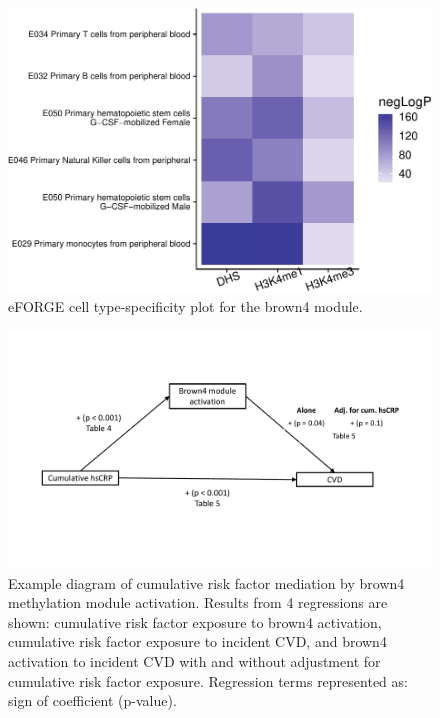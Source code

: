 \documentclass[]{article}
\begin{document}
\begin{figure}[htbp]
\centering
\includegraphics{../doc/module_ewas/figures/print-eforge-plots-1.pdf}
\caption{\label{fig:print-eforge-plots}eFORGE cell type-specificity plot for
the brown4 module.}
\end{figure}

\begin{figure}[htbp]
\centering
\includegraphics{../doc/module_ewas/hscrp_mediation_diagram.pdf}
\caption{\label{fig:causal-diagram-hscrp}Example diagram of cumulative risk
factor mediation by brown4 methylation module activation. Results from 4
regressions are shown: cumulative risk factor exposure to brown4
activation, cumulative risk factor exposure to incident CVD, and brown4
activation to incident CVD with and without adjustment for cumulative
risk factor exposure. Regression terms represented as: sign of
coefficient (p-value).}
\end{figure}
\end{document}
